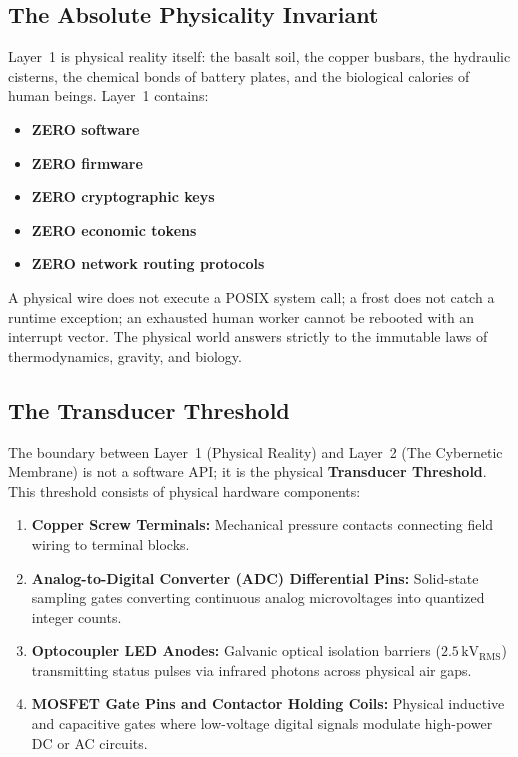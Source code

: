 \subsection{The Absolute Physicality Invariant}

Layer~1 is physical reality itself: the basalt soil, the copper busbars, the hydraulic cisterns, the chemical bonds of battery plates, and the biological calories of human beings. Layer~1 contains:
\begin{itemize}
    \item \textbf{ZERO software}
    \item \textbf{ZERO firmware}
    \item \textbf{ZERO cryptographic keys}
    \item \textbf{ZERO economic tokens}
    \item \textbf{ZERO network routing protocols}
\end{itemize}

A physical wire does not execute a POSIX system call; a frost does not catch a runtime exception; an exhausted human worker cannot be rebooted with an interrupt vector. The physical world answers strictly to the immutable laws of thermodynamics, gravity, and biology.

\subsection{The Transducer Threshold}

The boundary between Layer~1 (Physical Reality) and Layer~2 (The Cybernetic Membrane) is not a software API; it is the physical \textbf{Transducer Threshold}. This threshold consists of physical hardware components:
\begin{enumerate}
    \item \textbf{Copper Screw Terminals:} Mechanical pressure contacts connecting field wiring to terminal blocks.
    \item \textbf{Analog-to-Digital Converter (ADC) Differential Pins:} Solid-state sampling gates converting continuous analog microvoltages into quantized integer counts.
    \item \textbf{Optocoupler LED Anodes:} Galvanic optical isolation barriers ($2.5\,\mathrm{kV}_{\mathrm{RMS}}$) transmitting status pulses via infrared photons across physical air gaps.
    \item \textbf{MOSFET Gate Pins and Contactor Holding Coils:} Physical inductive and capacitive gates where low-voltage digital signals modulate high-power DC or AC circuits.
\end{enumerate}

